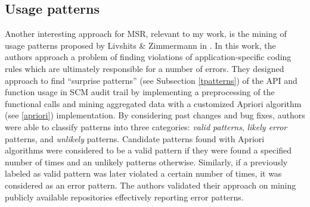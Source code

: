 \subsection{Usage patterns}
Another interesting approach for MSR, relevant to my work, is the mining of
usage patterns proposed by Livshits \& Zimmermann in \cite{citeulike:5398684}.
In this work, the authors approach a problem of finding violations of
application-specific coding rules which are ultimately responsible for a number
of errors. They designed approach to find ``surprise patterns'' (see Subsection
\ref{tpatterns}) of the API and function usage in SCM audit trail by
implementing a preprocessing of the functional calls and mining aggregated data
with a customized Apriori algorithm (see \ref{apriori}) implementation. By
considering past changes and bug fixes, authors were able to classify patterns
into three categories: \textit{valid patterns}, \textit{likely error} patterns,
and \textit{unlikely} patterns. Candidate patterns found with Apriori algorithms
were considered to be a valid pattern if they were found a specified number of
times and an unlikely patterns otherwise. Similarly, if a previously labeled as
valid pattern was later violated a certain number of times, it was considered as
an error pattern. The authors validated their approach on mining publicly
available repositories effectively reporting error patterns.
